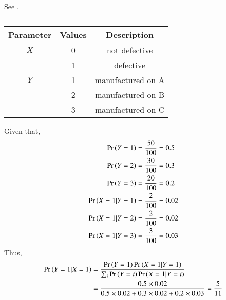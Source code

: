   See .
\begin{table}[H]
 \begin{center}
	  \begin{tabular}{|c|c|c|}
        \hline
        Parameter & Values & Description           \\
        \hline
        $X$ & 0 & not defective           \\
        \cline{2-3}
          & 1 & defective               \\
        \hline
        $Y$ & 1 & manufactured on A       \\
        \cline{2-3}
          & 2 & manufactured on B       \\
        \cline{2-3}
          & 3 & manufactured on C       \\
        \hline
    \end{tabular}
    \end{center}
    \caption{}
  \label{tab:exampler/12/13/3/48/} 
\end{table}
Given that,
 \begin{align}
        \Pr\left(Y=1\right) &= \frac{50}{100}
                 = 0.5\\
        \Pr\left(Y=2\right) &= \frac{30}{100}
                 = 0.3\\
        \Pr\left(Y=3\right) &= \frac{20}{100}
                 = 0.2\\         
        \Pr\left(X=1|Y=1\right) &= \frac{2}{100}
                     = 0.02\\
        \Pr\left(X=1|Y=2\right) &= \frac{2}{100}
                     = 0.02\\
        \Pr\left(X=1|Y=3\right) &= \frac{3}{100}
                     = 0.03
    \end{align}
    Thus, 
\begin{align}
	\Pr\left(Y=1|X=1\right) &= \frac{\Pr\left(Y=1\right)\Pr\left(X=1|Y=1\right)}{\sum_{i}\Pr\left(Y=i\right) \Pr\left(X=1|Y=i\right)}\\
             &= \frac{ 0.5 \times 0.02}{0.5 \times 0.02 + 0.3 \times  0.02 + 0.2 \times 0.03}
             = \frac{5}{11}
\end{align}

